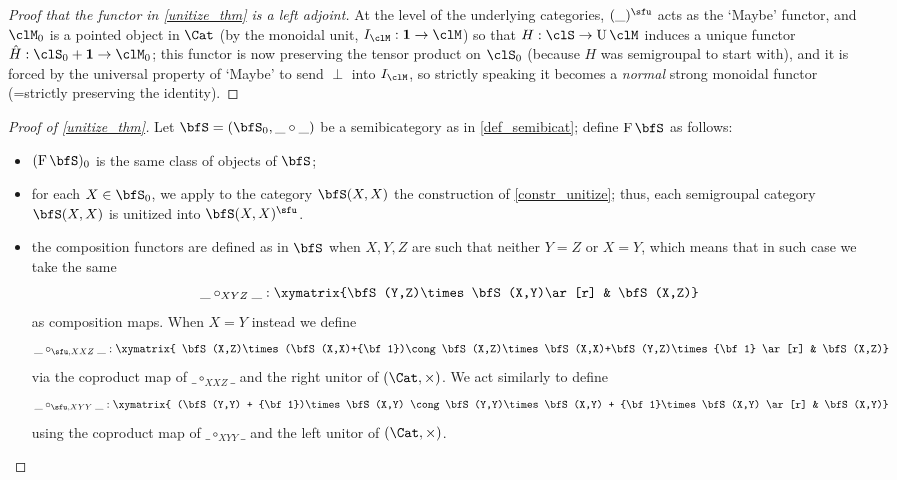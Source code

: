 \begin{proof}[Proof that the functor in \autoref{unitize_thm} is a left adjoint]
	At the level of the underlying categories, $(\_)^\un$ acts as the `Maybe' functor, and $\clM_0$ is a pointed object in $\Cat$ (by the monoidal unit, $I_\clM : {\bf 1}\to\clM$) so that $H : \clS\to \forg \clM$ induces a unique functor $\hat H : \clS_0 + {\bf 1}\to\clM_0$; this functor is now preserving the tensor product on $\clS_0$ (because $H$ was semigroupal to start with), and it is forced by the universal property of `Maybe' to send $\perp$ into $I_\clM$, so strictly speaking it becomes a \emph{normal} strong monoidal functor (=strictly preserving the identity).
\end{proof}
\begin{proof}[Proof of \autoref{unitize_thm}]\label{proof_of_thm_freebicat}
	Let $\bfS=(\bfS_0,\_\circ\_)$ be a semibicategory as in \autoref{def_semibicat}; define $\free\bfS$ as follows:
	\begin{itemize}
		\item $(\free\bfS)_0$ is the same class of objects of $\bfS$;
		\item for each $X\in\bfS_0$, we apply to the category $\bfS(X,X)$ the construction of \ref{constr_unitize}; thus, each semigroupal category $\bfS(X,X)$ is unitized into $\bfS(X,X)^\un$.
		\item the composition functors are defined as in $\bfS$ when $X,Y,Z$ are such that neither $Y=Z$ or $X=Y$, which means that in such case we take the same
		      \[\_\circ_{XYZ}\_ : \xymatrix{\bfS(Y,Z)\times\bfS(X,Y)\ar[r] & \bfS(X,Z)}\]
		      as composition maps. When $X=Y$ instead we define
		      \[\_\circ_{\un,XXZ}\_ : \xymatrix{
				      \bfS(X,Z)\times(\bfS(X,X)+{\bf 1})\cong
				      \bfS(X,Z)\times \bfS(X,X)+\bfS(Y,Z)\times {\bf 1}
				      \ar[r] & \bfS(X,Z)}\]
		      via the coproduct map of $\_\circ_{XXZ}\_$ and the right unitor of $(\Cat,\times)$. We act similarly to define
		      \[\_\circ_{\un,XYY}\_ : \xymatrix{
			      (\bfS(Y,Y) + {\bf 1})\times\bfS(X,Y)
			      \cong
			      \bfS(Y,Y)\times\bfS(X,Y) + {\bf 1}\times\bfS(X,Y)
			      \ar[r] & \bfS(X,Y)}\]
		      using the coproduct map of $\_\circ_{XYY}\_$ and the left unitor of $(\Cat,\times)$.


\end{itemize}
\end{proof}
